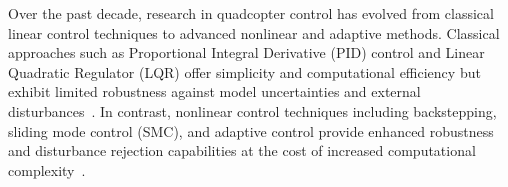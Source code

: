 \noindent Over the past decade, research in quadcopter control has evolved from classical linear control techniques to advanced nonlinear and adaptive methods. Classical approaches such as Proportional Integral Derivative (PID) control and Linear Quadratic Regulator (LQR) offer simplicity and computational efficiency but exhibit limited robustness against model uncertainties and external disturbances~\cite{samy2024robust,labbadi2020novel}. In contrast, nonlinear control techniques including backstepping, sliding mode control (SMC), and adaptive control provide enhanced robustness and disturbance rejection capabilities at the cost of increased computational complexity~\cite{pan2021robust,zhang2020adaptive}.


